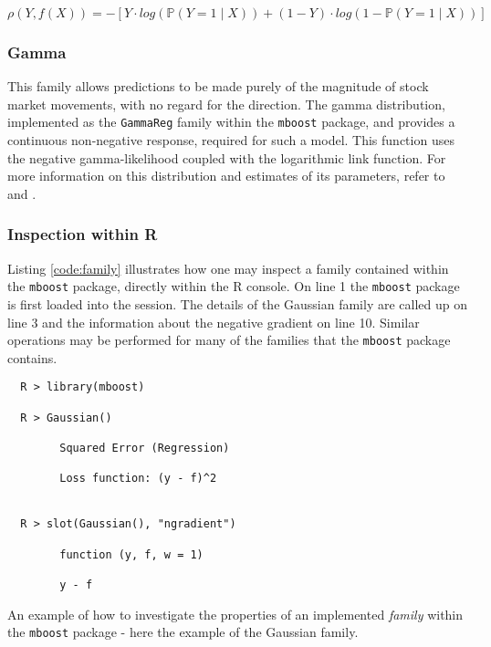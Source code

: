 \documentclass{article}
\begin{document}
\begin{equation}
  \label{eqn-bin-error}
  \rho (Y, f(X)) = - \left[ Y \cdot log(\mathbb{P} (Y = 1 \mid X)) + (1-Y) \cdot log(1 - \mathbb{P} (Y = 1 \mid X)) \right]
\end{equation}



\subsubsection{Gamma}
\label{sec-1-6-3}

This family allows predictions to be made purely of the magnitude of stock market movements, with no regard for the direction. The gamma distribution, implemented as the \texttt{GammaReg} family within the \texttt{mboost} package, and provides a continuous non-negative response, required for such a model. This function uses the negative gamma-likelihood coupled with the logarithmic link function. For more information on this distribution and estimates of its parameters, refer to \cite{Hofner2012} and \cite{choi1969maximum}.


\subsubsection{Inspection within R}
\label{sec-1-6-4}

Listing \ref{code:family} illustrates how one may inspect a family contained within the \texttt{mboost} package, directly within the R console. On line 1 the \texttt{mboost} package is first loaded into the session. The details of the Gaussian family are called up on line 3 and the information about the negative gradient on line 10. Similar operations may be performed for many of the families that the \texttt{mboost} package contains.

\vspace{5mm}

\begin{listing}[H]
\begin{verbatim}
  R > library(mboost)

  R > Gaussian()

        Squared Error (Regression) 

        Loss function: (y - f)^2 


  R > slot(Gaussian(), "ngradient")

        function (y, f, w = 1) 
    
        y - f
\end{verbatim}
\caption[A guideline to inspecting the \texttt{mboost} Gaussian family]{\label{code:family}An example of how to investigate the properties of an implemented \emph{family} within the \texttt{mboost} package - here the example of the Gaussian family.}
\end{listing}
\end{document}
